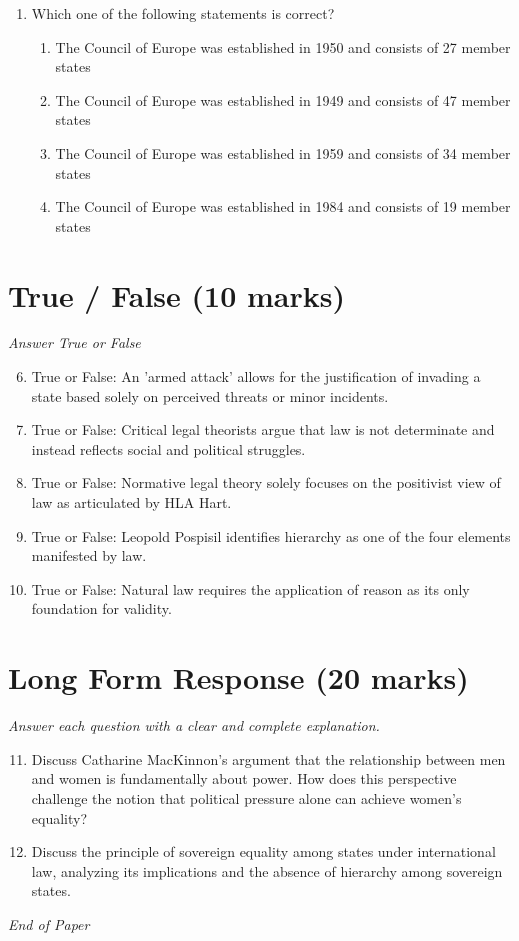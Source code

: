 \documentclass[12pt]{article}
\begin{document}
\begin{enumerate}[label=\arabic*.]
\begin{enumerate}[label=(\alph*)]
    \item Article 11
\end{enumerate}
\item Which one of the following statements is correct?
\begin{enumerate}[label=(\alph*)]
    \item The Council of Europe was established in 1950 and consists of 27 member states
    \item The Council of Europe was established in 1949 and consists of 47 member states
    \item The Council of Europe was established in 1959 and consists of 34 member states
    \item The Council of Europe was established in 1984 and consists of 19 member states
\end{enumerate}
\end{enumerate}

\section*{True / False (10 marks)}
\textit{Answer True or False}
\begin{enumerate}[label=\arabic*.]
\setcounter{enumi}{5}
\item True or False: An 'armed attack' allows for the justification of invading a state based solely on perceived threats or minor incidents.
\item True or False: Critical legal theorists argue that law is not determinate and instead reflects social and political struggles.
\item True or False: Normative legal theory solely focuses on the positivist view of law as articulated by HLA Hart.
\item True or False: Leopold Pospisil identifies hierarchy as one of the four elements manifested by law.
\item True or False: Natural law requires the application of reason as its only foundation for validity.
\end{enumerate}

\section*{Long Form Response (20 marks)}
\textit{Answer each question with a clear and complete explanation.}
\begin{enumerate}[label=\arabic*.]
\setcounter{enumi}{10}
\item Discuss Catharine MacKinnon's argument that the relationship between men and women is fundamentally about power. How does this perspective challenge the notion that political pressure alone can achieve women's equality?
\item Discuss the principle of sovereign equality among states under international law, analyzing its implications and the absence of hierarchy among sovereign states.
\end{enumerate}

\vfill
\noindent\textit{End of Paper}
\end{document}
